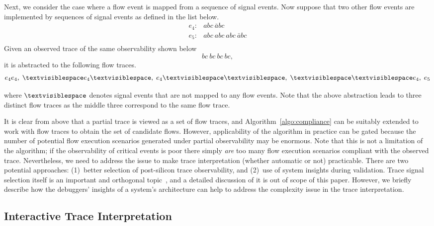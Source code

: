 \documentclass[conference]{IEEEtran}
\begin{document}
Next, we consider the case where a flow event is mapped from
a sequence of signal events.  Now suppose that two other
flow events are implemented by sequences of signal events as
defined in the list below.
\[
\begin{array}{cl}
e_4: & abc\ \bar{a}bc\\
e_5: & abc\ abc\ abc\ \bar{a}bc\\
\end{array}
\] 
Given an observed trace of the same observability shown below
\[
bc\ bc\ bc \ bc,
\]
it is abstracted to the following flow traces.
\[
e_4e_4,\; \textvisiblespace e_4 \textvisiblespace,\;  e_4 \textvisiblespace \textvisiblespace,\;  \textvisiblespace \textvisiblespace e_4, \; e_5
\] 

where $\textvisiblespace$ denotes signal events that are not
mapped to any flow events.  Note that the above abstraction
leads to three distinct flow traces as the middle three
correspond to the same flow trace.

It is clear from above that a partial trace is viewed as a
set of flow traces, and Algorithm~\ref{algo:compliance} can
be suitably extended to work with flow traces to obtain the
set of candidate flows.  However, applicability of the
algorithm in practice can be gated because the number of
potential flow execution scenarios generated under partial
observability may be enormous.  Note that this is not a
limitation of the algorithm; if the observability of
critical events is poor there simply {\em are} too many flow
execution scenarios compliant with the observed trace.
Nevertheless, we need to address the issue to make trace
interpretation (whether automatic or not) practicable.
There are two potential approaches: (1)~better selection of
post-silicon trace observability, and (2)~use of system
insights during validation.  Trace signal selection itself
is an important and orthogonal topic~\cite{nicolici,basu},
and a detailed discussion of it is out of scope of this
paper.  However, we briefly describe how the debuggers'
insights of a system's architecture can help to address the
complexity issue in the trace interpretation.


\subsection{Interactive Trace Interpretation}
\end{document}
